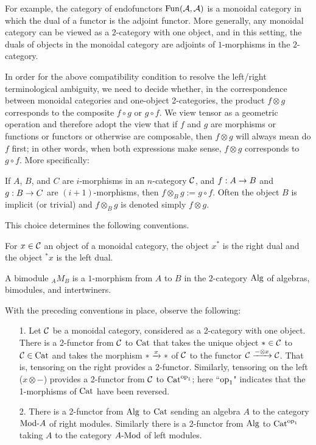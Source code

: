 \documentclass{amsart}
\begin{document}
\nid For example, the category of endofunctors $\operatorname{Fun}(\mathcal A, \mathcal A)$ is a monoidal category in which the dual of a functor is the adjoint functor.  More generally, any monoidal category can be viewed as a $2$-category with one object, and in this setting, the duals of objects in the monoidal category are adjoints of $1$-morphisms in the $2$-category.  

In order for the above compatibility condition to resolve the left/right terminological ambiguity, we need to decide whether, in the correspondence between monoidal categories and one-object 2-categories, the product $f \otimes g$ corresponds to the composite $f \circ g$ or $g \circ f$.  We view tensor as a geometric operation and therefore adopt the view that if $f$ and $g$ are morphisms or functions or functors or otherwise are composable, then $f \otimes g$ will always mean do $f$ first; in other words, when both expressions make sense, $f \otimes g$ corresponds to $g \circ f$.  More specifically:

\begin{definition} \label{def-tensorcomp}
If $A$, $B$, and $C$ are $i$-morphisms in an $n$-category $\mathcal C$, and $f: A \rightarrow B$ and $g: B \rightarrow C$ are $(i+1)$-morphisms, then $f \otimes_B g := g \circ f$.  Often the object $B$ is implicit (or trivial) and $f \otimes_B g$ is denoted simply $f \otimes g$.
\end{definition}

This choice determines the following conventions.
\begin{definition}
For $x \in \mathcal C$ an object of a monoidal category, the object $x^*$ is the right dual and the object ${}^*x$ is the left dual.
\end{definition}
\begin{definition}
A bimodule ${}_A M_B$ is a $1$-morphism from $A$ to $B$ in the $2$-category $\mathrm{Alg}$ of algebras, bimodules, and intertwiners.
\end{definition}

With the preceding conventions in place, observe the following:
\begin{itemize}
\item[1.] Let $\mathcal C$ be a monoidal category, considered as a 2-category with one object.  There is a 2-functor from $\mathcal C$ to $\mathrm{Cat}$ that takes the unique object $\ast \in \mathcal C$ to $\mathcal C \in \mathrm{Cat}$ and takes the morphism $\ast \xrightarrow{x} \ast$ of $\mathcal C$ to the functor $\mathcal C \xrightarrow{- \otimes x} \mathcal C$.  That is, tensoring on the right provides a 2-functor.  Similarly, tensoring on the left ($x \otimes -$) provides a 2-functor from $\mathcal C$ to $\mathrm{Cat}^{\mathrm{op}_1}$; here ``$\mathrm{op}_1$" indicates that the 1-morphisms of $\mathrm{Cat}$ have been reversed.
\item[2.] There is a 2-functor from $\mathrm{Alg}$ to $\mathrm{Cat}$ sending an algebra $A$ to the category $\Mod{}{A}$ of right modules.  Similarly there is a 2-functor from $\mathrm{Alg}$ to $\mathrm{Cat}^{\mathrm{op}_1}$ taking $A$ to the category $\Mod{A}{}$ of left modules.
\end{itemize}
\end{document}
